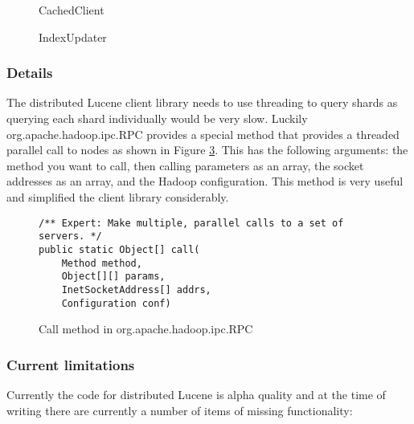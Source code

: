 \documentclass[a4paper,10pt]{article}
\begin{document}
\begin{figure}

\caption{CachedClient}
\label{CachedClient}
\end{figure}

\begin{figure}

\caption{IndexUpdater}
\label{IndexUpdater}
\end{figure}

\subsubsection{Details}
The distributed Lucene client library needs to use threading to query shards as querying each shard individually would be very slow. Luckily org.\-apache.\-hadoop.\-ipc.\-RPC provides a special method that provides a threaded parallel call to nodes as shown in Figure \ref{ipc.RPC}. This has the following arguments: the method you want to call, then calling parameters as an array, the socket addresses as an array, and the Hadoop configuration. This method is very useful and simplified the client library considerably. 

\begin{figure}
\begin{lstlisting}
/** Expert: Make multiple, parallel calls to a set of servers. */
public static Object[] call(
	Method method, 
	Object[][] params,
	InetSocketAddress[] addrs, 
	Configuration conf)
\end{lstlisting}
\caption{Call method in org.apache.hadoop.ipc.RPC}
\label{ipc.RPC}
\end{figure}

\subsubsection{Current limitations}

Currently the code for distributed Lucene is alpha quality and at the time of writing there are currently a number of items of missing functionality:
\end{document}
